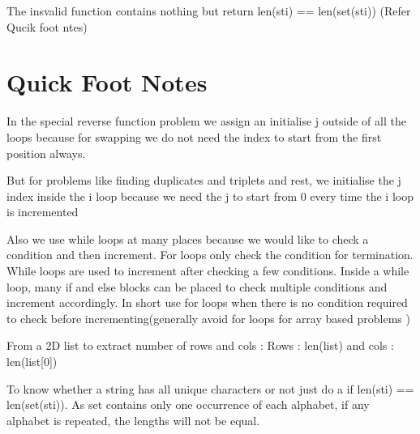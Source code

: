 \documentclass{article}
\newcommand{\nd}{\noindent}
\begin{document}
\nd The insvalid function contains nothing but return len(sti) == len(set(sti)) (Refer Qucik foot ntes)
\newpage 
\section {Quick Foot Notes }
In the special reverse function problem we assign an initialise j outside of all the loops because for swapping we do not need the index to start from the first position always. 

\nd But for problems like finding duplicates and triplets and rest, we initialise the j index inside the i loop because we need the j to start from 0 every time the i loop is incremented

\nd Also we use while loops at many places because we would like to check a condition and then increment. For loops only check the condition for termination. While loops are used to increment after checking a few conditions. Inside a while loop, many if and else blocks can be placed to check multiple conditions and increment accordingly. In short use for loops when there is no condition required to check before incrementing(generally avoid for loops for array based problems )

\nd From a 2D list to extract number of rows and cols : Rows : len(list) and cols : len(list[0])

\nd To know whether a string has all unique characters or not just do a if len(sti) == len(set(sti)). As set contains only one occurrence of each alphabet, if any alphabet is repeated, the lengths will not be equal. 
\end{document}
